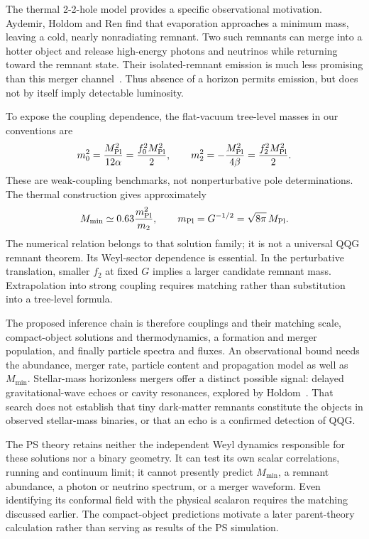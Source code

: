 The thermal 2-2-hole model provides a specific observational motivation.  Aydemir, Holdom and Ren find that evaporation approaches a minimum mass, leaving a cold, nearly nonradiating remnant.  Two such remnants can merge into a hotter object and release high-energy photons and neutrinos while returning toward the remnant state.  Their isolated-remnant emission is much less promising than this merger channel~\cite{AydemirHoldomRen:2020}.  Thus absence of a horizon permits emission, but does not by itself imply detectable luminosity.

To expose the coupling dependence, the flat-vacuum tree-level masses in our conventions are~\cite{Salvio:2018}
\begin{equation}
 m_0^2=\frac{M_{\rm Pl}^2}{12\alpha}
       =\frac{f_0^2M_{\rm Pl}^2}{2},\qquad
 m_2^2=-\frac{M_{\rm Pl}^2}{4\beta}
       =\frac{f_2^2M_{\rm Pl}^2}{2}.
 \label{eq:compact-object-pole-scales}
\end{equation}
These are weak-coupling benchmarks, not nonperturbative pole determinations.  The thermal construction gives approximately~\cite{AydemirHoldomRen:2020}
\begin{equation}
 M_{\min}\simeq0.63\frac{m_{\rm Pl}^2}{m_2},
 \qquad m_{\rm Pl}=G^{-1/2}=\sqrt{8\pi}\,M_{\rm Pl}.
 \label{eq:two-two-remnant-scale}
\end{equation}
The numerical relation belongs to that solution family; it is not a universal QQG remnant theorem.  Its Weyl-sector dependence is essential.  In the perturbative translation, smaller $f_2$ at fixed $G$ implies a larger candidate remnant mass.  Extrapolation into strong coupling requires matching rather than substitution into a tree-level formula.

The proposed inference chain is therefore couplings and their matching scale, compact-object solutions and thermodynamics, a formation and merger population, and finally particle spectra and fluxes.  An observational bound needs the abundance, merger rate, particle content and propagation model as well as $M_{\min}$.  Stellar-mass horizonless mergers offer a distinct possible signal: delayed gravitational-wave echoes or cavity resonances, explored by Holdom~\cite{Holdom:2020LIGO}.  That search does not establish that tiny dark-matter remnants constitute the objects in observed stellar-mass binaries, or that an echo is a confirmed detection of QQG.

The PS theory retains neither the independent Weyl dynamics responsible for these solutions nor a binary geometry.  It can test its own scalar correlations, running and continuum limit; it cannot presently predict $M_{\min}$, a remnant abundance, a photon or neutrino spectrum, or a merger waveform.  Even identifying its conformal field with the physical scalaron requires the matching discussed earlier.  The compact-object predictions motivate a later parent-theory calculation rather than serving as results of the PS simulation.

